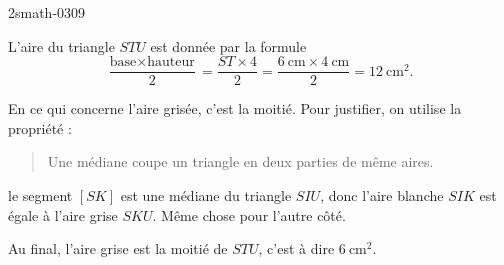 
\begin{corrige}{2smath-0309}

    L'aire du triangle \( STU\) est donnée par la formule 
    \begin{equation}
        \frac{ \text{base}\times\text{hauteur} }{ 2 }=\frac{ ST\times 4 }{ 2 }=\frac{ \SI{6}{\centi\meter}\times \SI{4}{\centi\meter} }{ 2 }=\SI{12}{\centi\meter\squared}.
    \end{equation}
    

    En ce qui concerne l'aire grisée, c'est la moitié. Pour justifier, on utilise la propriété :

    \begin{quote}
        Une médiane coupe un triangle en deux parties de même aires.
    \end{quote}

    le segment \( [SK]\) est une médiane du triangle \( SIU\), donc l'aire blanche \( SIK\) est égale à l'aire grise \( SKU\). Même chose pour l'autre côté.

    Au final, l'aire grise est la moitié de \( STU\), c'est à dire \( \SI{6}{\centi\meter\squared}\).

\end{corrige}

